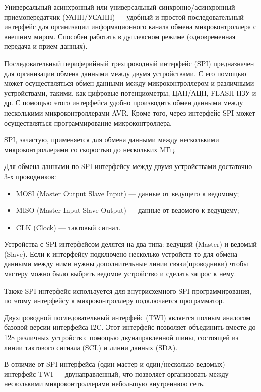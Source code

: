 \documentclass[12pt, oneside]{altsu-report}
\begin{document}
Универсальный асинхронный или универсальный синхронно/асинхронный приемопередатчик (УАПП/УСАПП) --- удобный и простой последовательный интерфейс для организации информационного канала обмена микроконтроллера с внешним миром. Способен работать в дуплексном режиме (одновременная передача и прием данных).

Последовательный периферийный трехпроводный интерфейс (SPI) предназначен для организации обмена данными между двумя устройствами. С его помощью может осуществляться обмен данными между микроконтроллером и различными устройствами, такими, как цифровые потенциометры, ЦАП/АЦП, FLASH ПЗУ и др. С помощью этого интерфейса удобно производить обмен данными между несколькими микроконтроллерами AVR. Кроме того, через интерфейс SPI может осуществляться программирование микроконтроллера.

SPI, зачастую, применяется для обмена данными между несколькими микроконтроллерами со скоростью до нескольких MГц.~\cite{AVR}

Для обмена данными по SPI интерфейсу между двумя устройствами достаточно 3-х проводников:

\begin{itemize}
    \item MOSI (Master Output Slave Input) --- данные от ведущего к ведомому;

    \item MISO (Master Input Slave Output) --- данные от ведомого к ведущему;

    \item CLK (Clock) ---  тактовый сигнал.
\end{itemize}

Устройства с SPI-интерфейсом делятся на два типа: ведущий (Master) и ведомый (Slave). Если к интерфейсу подключено несколько устройств то для обмена данными между ними нужны дополнительные линии связи(проводники) чтобы мастеру можно было выбрать ведомое устройство и сделать запрос к нему.

Также SPI интерфейс используется для внутрисхемного SPI программирования, по этому интерфейсу к микроконтроллеру подключается программатор. 

Двухпроводной последовательный интерфейс (TWI) является полным аналогом базовой версии интерфейса I2C. Этот интерфейс позволяет объединить вместе до 128 различных устройств с помощью двунаправленной шины, состоящей из линии тактового сигнала (SCL) и линии данных (SDA).

В отличие от SPI интерфейса (один мастер и один/несколько ведомых) интерфейс TWI --- двунаправленный, что позволяет организовать между несколькими микроконтроллерами небольшую внутреннюю сеть.
\end{document}

